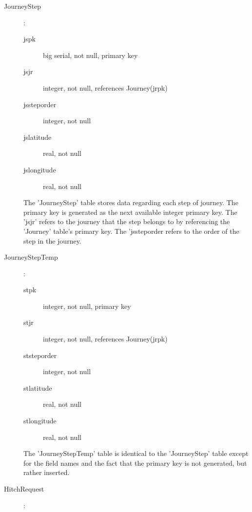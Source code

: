 \documentclass[11pt]{article}
\begin{document}
\begin{description}
\item[Journey\textunderscore Step]:

	\begin{description}
	\item[js\textunderscore pk] big serial, not null, primary key
	\item[js\textunderscore jr] integer, not null, references Journey(jr\textunderscore pk)
	\item[js\textunderscore step\textunderscore order] integer, not null
	\item[js\textunderscore latitude] real, not null
	\item[js\textunderscore longitude] real, not null
	\end{description}
	
The 'Journey\textunderscore Step' table stores data regarding each step of journey. The primary key is generated as the next available integer primary key. The 'js\textunderscore jr' refers to the journey that the step belongs to by referencing the 'Journey' table's primary key. The 'js\textunderscore step\textunderscore order refers to the order of the step in the journey.

\item[Journey\textunderscore Step\textunderscore Temp]:

	\begin{description}
	\item[st\textunderscore pk] integer, not null, primary key
	\item[st\textunderscore jr] integer, not null, references Journey(jr\textunderscore pk)
	\item[st\textunderscore step\textunderscore order] integer, not null
	\item[st\textunderscore latitude] real, not null
	\item[st\textunderscore longitude] real, not null
	\end{description}
	
The 'Journey\textunderscore Step\textunderscore Temp' table is identical to the 'Journey\textunderscore Step' table except for the field names and the fact that the primary key is not generated, but rather inserted.
	
\item[Hitch\textunderscore Request]:


\end{description}
\end{document}
